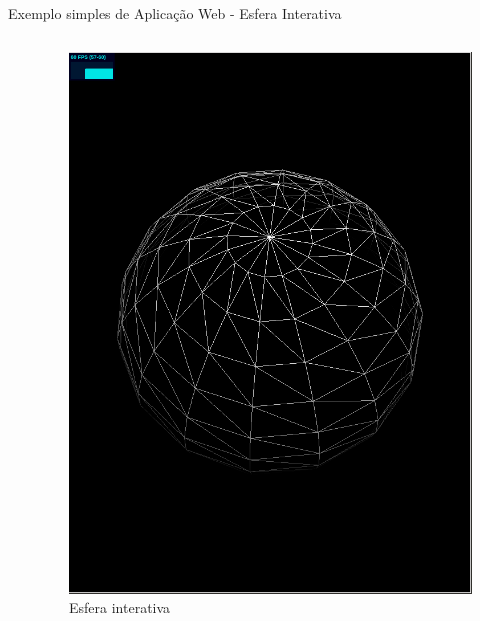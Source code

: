 \documentclass[final,hyperref={pdfpagelabels=false}]{beamer}
\begin{document}
\begin{frame}[t]
\begin{columns}[t]
\begin{column}{.465\textwidth}
\begin{block}{Exemplo simples de Aplicação Web - Esfera Interativa}
\begin{columns}
\begin{column}{.54\textwidth}

\end{column}

\begin{column}{.43\textwidth} %
\centering
\begin{figure}
\includegraphics[width=0.8\linewidth]{sphere.png}
\caption{Esfera interativa}
\end{figure}
\end{column}
\end{columns} %

\end{block}




\end{column}
\end{columns}
\end{frame}
\end{document}
